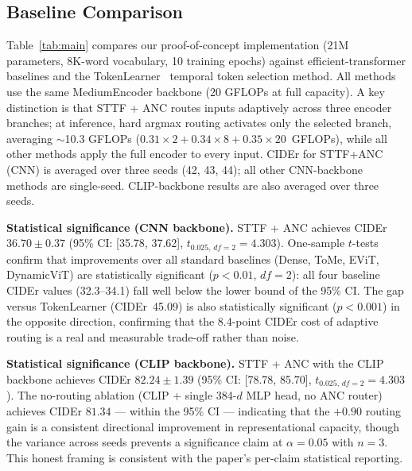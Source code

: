 \documentclass{article}
\begin{document}
\subsection{Baseline Comparison}

Table~\ref{tab:main} compares our proof-of-concept implementation (21M parameters, 8K-word vocabulary, 10 training epochs) against efficient-transformer baselines and the TokenLearner~\cite{ryoo2021tokenlearner} temporal token selection method.
All methods use the same MediumEncoder backbone (20 GFLOPs at full capacity).
A key distinction is that STTF + ANC routes inputs adaptively across three encoder branches; at inference, hard argmax routing activates only the selected branch, averaging $\sim$10.3 GFLOPs ($0.31{\times}2 + 0.34{\times}8 + 0.35{\times}20$~GFLOPs), while all other methods apply the full encoder to every input.
CIDEr for STTF+ANC (CNN) is averaged over three seeds (42, 43, 44); all other CNN-backbone methods are single-seed. CLIP-backbone results are also averaged over three seeds.

\textbf{Statistical significance (CNN backbone).}
STTF + ANC achieves CIDEr $36.70 \pm 0.37$ (95\% CI: [35.78, 37.62], $t_{0.025,\,df=2}{=}4.303$).
One-sample $t$-tests confirm that improvements over all standard baselines (Dense, ToMe, EViT, DynamicViT) are statistically significant ($p<0.01$, $df=2$): all four baseline CIDEr values (32.3--34.1) fall well below the lower bound of the 95\% CI.
The gap versus TokenLearner (CIDEr~45.09) is also statistically significant ($p<0.001$) in the opposite direction, confirming that the 8.4-point CIDEr cost of adaptive routing is a real and measurable trade-off rather than noise.

\textbf{Statistical significance (CLIP backbone).}
STTF + ANC with the CLIP backbone achieves CIDEr $82.24 \pm 1.39$ (95\% CI: [78.78, 85.70], $t_{0.025,\,df=2}{=}4.303$).
The no-routing ablation (CLIP + single 384-$d$ MLP head, no ANC router) achieves CIDEr $81.34$ --- within the 95\% CI --- indicating that the $+0.90$ routing gain is a consistent directional improvement in representational capacity, though the variance across seeds prevents a significance claim at $\alpha{=}0.05$ with $n{=}3$. This honest framing is consistent with the paper's per-claim statistical reporting.
\end{document}
